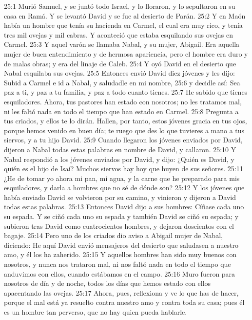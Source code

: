 25:1 Murió Samuel, y se juntó todo Israel, y lo lloraron, y lo sepultaron en su casa en Ramá. Y se levantó David y se fue al desierto de Parán.  
25:2 Y en Maón había un hombre que tenía su hacienda en Carmel, el cual era muy rico, y tenía tres mil ovejas y mil cabras. Y aconteció que estaba esquilando sus ovejas en Carmel.  
25:3 Y aquel varón se llamaba Nabal, y su mujer, Abigail. Era aquella mujer de buen entendimiento y de hermosa apariencia, pero el hombre era duro y de malas obras; y era del linaje de Caleb.  
25:4 Y oyó David en el desierto que Nabal esquilaba sus ovejas.  
25:5 Entonces envió David diez jóvenes y les dijo: Subid a Carmel e id a Nabal, y saludadle en mi nombre,  
25:6 y decidle así: Sea paz a ti, y paz a tu familia, y paz a todo cuanto tienes.  
25:7 He sabido que tienes esquiladores. Ahora, tus pastores han estado con nosotros; no les tratamos mal, ni les faltó nada en todo el tiempo que han estado en Carmel.  
25:8 Pregunta a tus criados, y ellos te lo dirán. Hallen, por tanto, estos jóvenes gracia en tus ojos, porque hemos venido en buen día; te ruego que des lo que tuvieres a mano a tus siervos, y a tu hijo David.  
25:9 Cuando llegaron los jóvenes enviados por David, dijeron a Nabal todas estas palabras en nombre de David, y callaron.  
25:10 Y Nabal respondió a los jóvenes enviados por David, y dijo: ¿Quién es David, y quién es el hijo de Isaí? Muchos siervos hay hoy que huyen de sus señores.  
25:11 ¿He de tomar yo ahora mi pan, mi agua, y la carne que he preparado para mis esquiladores, y darla a hombres que no sé de dónde son?  
25:12 Y los jóvenes que había enviado David se volvieron por su camino, y vinieron y dijeron a David todas estas palabras.  
25:13 Entonces David dijo a sus hombres: Cíñase cada uno su espada. Y se ciñó cada uno su espada y también David se ciñó su espada; y subieron tras David como cuatrocientos hombres, y dejaron doscientos con el bagaje.  
25:14 Pero uno de los criados dio aviso a Abigail mujer de Nabal, diciendo: He aquí David envió mensajeros del desierto que saludasen a nuestro amo, y él los ha zaherido.  
25:15 Y aquellos hombres han sido muy buenos con nosotros, y nunca nos trataron mal, ni nos faltó nada en todo el tiempo que anduvimos con ellos, cuando estábamos en el campo.  
25:16 Muro fueron para nosotros de día y de noche, todos los días que hemos estado con ellos apacentando las ovejas.  
25:17 Ahora, pues, reflexiona y ve lo que has de hacer, porque el mal está ya resuelto contra nuestro amo y contra toda su casa; pues él es un hombre tan perverso, que no hay quien pueda hablarle.  
